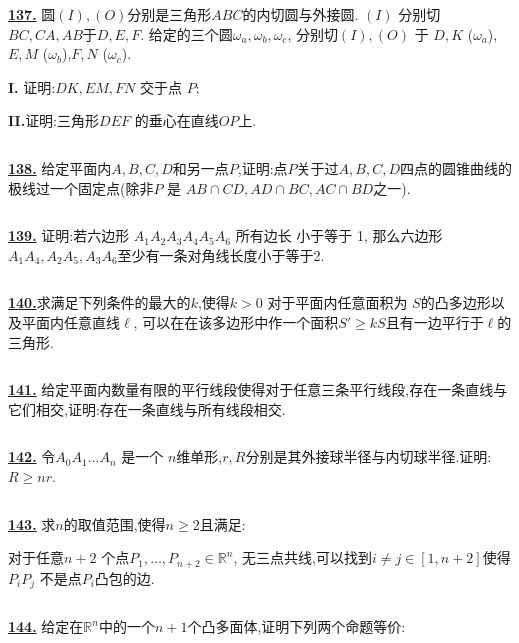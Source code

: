 \documentclass{article}
\begin{document}
$$ $$


\href{http://www.artofproblemsolving.com/Forum/viewtopic.php?p=229579#p229579
 }{\bf 137.} 圆$(I),(O)$分别是三角形$ABC$的内切圆与外接圆. $(I)$ 分别切$BC,CA,AB$于$D,E,F$. 给定的三个圆$\omega_a,\omega_b,\omega_c$, 分别切$(I),(O)$ 于 $D,K$ ($\omega_a$), $E,M$ ($\omega_b$),$F,N$ ($\omega_c$).
 
{\bf I.} 证明:$DK,EM,FN$ 交于点 $P$;

{\bf II.}证明:三角形$DEF$ 的垂心在直线$OP$上.


$$ $$


\href{http://www.artofproblemsolving.com/Forum/viewtopic.php?p=260264#p260264
 }{\bf 138.} 给定平面内$A,B,C,D$和另一点$P$,证明:点$P$关于过$A,B,C,D$四点的圆锥曲线的极线过一个固定点(除非$P$ 是 $AB\cap CD,AD\cap BC,AC\cap BD$之一).


$$ $$


\href{ http://www.artofproblemsolving.com/Forum/viewtopic.php?p=319718#p319718
}{\bf 139.} 证明:若六边形 $A_1A_2A_3A_4A_5A_6$ 所有边长 小于等于 1, 那么六边形$A_1A_4,A_2A_5,A_3A_6$至少有一条对角线长度小于等于2.


$$ $$


\href{ http://www.artofproblemsolving.com/Forum/viewtopic.php?p=320556#p320556
}{\bf 140.}求满足下列条件的最大的$k$,使得$k>0$ 对于平面内任意面积为 $S$的凸多边形以及平面内任意直线$\ell$, 可以在在该多边形中作一个面积$S'\ge kS$且有一边平行于$\ell$的三角形.


$$ $$


\href{ http://www.artofproblemsolving.com/Forum/viewtopic.php?p=324872#p324872
}{\bf 141.}  给定平面内数量有限的平行线段使得对于任意三条平行线段,存在一条直线与它们相交,证明:存在一条直线与所有线段相交.


$$ $$


\href{ http://www.artofproblemsolving.com/Forum/viewtopic.php?p=397953#p397953
}{\bf 142.} 令$A_0A_1\ldots A_n$ 是一个 $n$维单形,$r,R$分别是其外接球半径与内切球半径.证明:$R\ge nr$.


$$ $$


\href{ http://www.artofproblemsolving.com/Forum/viewtopic.php?p=415477#p415477
}{\bf 143.} 求$n$的取值范围,使得$n\ge 2$且满足:

对于任意$n+2$ 个点$P_1,\ldots,P_{n+2}\in\mathbb R^n$, 无三点共线,可以找到$i\ne j\in [1,n+2]$使得$P_iP_j$ 不是点$P_i$凸包的边.


$$ $$

\href{ http://www.artofproblemsolving.com/Forum/viewtopic.php?p=434449#p434449
}{\bf 144.} 给定在$\mathbb R^n$中的一个$n+1$个凸多面体,证明下列两个命题等价:
\end{document}
